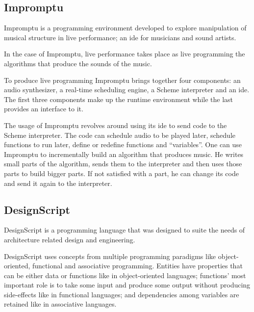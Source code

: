 \documentclass{./llncs2e/llncs}
\begin{document}
\subsection{Impromptu\cite{sorensen2005impromptu}\cite{sorensen2010programming}}
	Impromptu is a programming environment developed to explore manipulation of musical structure in live performance; an \ac{ide} for musicians and sound artists.

	In the case of Impromptu, live performance takes place as live programming the algorithms that produce the sounds of the music.

	To produce live programming Impromptu brings together four components: an audio synthesizer, a real-time scheduling engine, a Scheme interpreter and an \ac{ide}. The first three components make up the runtime environment while the last provides an interface to it. 

	The usage of Impromptu revolves around using its \ac{ide} to send code to the Scheme interpreter. The code can schedule audio to be played later, schedule functions to run later, define or redefine functions and ``variables''. 
	One can use Impromptu to incrementally build an algorithm that produces music. He writes small parts of the algorithm, sends them to the interpreter and then uses those parts to build bigger parts. If not satisfied with a part, he can change its code and send it again to the interpreter.


\subsection{DesignScript\cite{aish2012designscript}}
	DesignScript is a programming language that was designed to suite the needs of architecture related design and engineering.

	DesignScript uses concepts from multiple programming paradigms like object-oriented, functional and associative programming. Entities have properties that can be either data or functions like in object-oriented languages; functions' most important role is to take some input and produce some output without producing side-effects like in functional languages; and dependencies among variables are retained like in associative languages.
\end{document}
